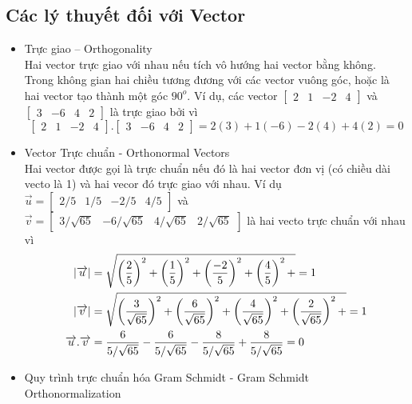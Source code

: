\subsection{Các lý thuyết đối với Vector}
\begin{itemize}
  \item Trực giao – Orthogonality\\
  Hai vector trực giao với nhau nếu tích vô hướng hai vector bằng không. Trong
  không gian hai chiều tương đương với các vector vuông góc, hoặc là hai vector
  tạo thành một góc $90^o$. Ví dụ, các vector $\begin{bmatrix} 2 & 1 & -2 & 4
  \end{bmatrix}$ và $\begin{bmatrix} 3 & -6 & 4 & 2 \end{bmatrix}$ là trực giao
  bởi vì
  \[ \begin{bmatrix} 2 & 1 & -2 & 4 \end{bmatrix} . \begin{bmatrix} 3 & -6 & 4 &
  2 \end{bmatrix} = 2(3) + 1(-6) - 2(4) + 4(2) = 0\]
  \item Vector Trực chuẩn - Orthonormal Vectors\\
  Hai vector được gọi là trực chuẩn nếu đó là hai vector đơn vị
  (có chiều dài vecto là 1) và hai vecor đó trực giao với nhau. Ví dụ
  $\overrightarrow{u} = \begin{bmatrix} 2/5 & 1/5 & -2/5 & 4/5
  \end{bmatrix}$ và $\overrightarrow{v} = \begin{bmatrix} 3/\sqrt{65} &
  -6/\sqrt{65} & 4/\sqrt{65} & 2/\sqrt{65} \end{bmatrix}$ là hai vecto trực chuẩn với nhau vì
  \begin{align}
  |\overrightarrow{u}| &= \sqrt{\left(\frac{2}{5}\right)^2 +
  \left(\frac{1}{5}\right)^2 + \left(\frac{-2}{5}\right)^2 + \left(\frac{4}{5}\right)^2 +} = 1\notag\\
  |\overrightarrow{v}| &= \sqrt{\left(\frac{3}{\sqrt{65}}\right)^2 +
  \left(\frac{6}{\sqrt{65}}\right)^2 + \left(\frac{4}{\sqrt{65}}\right)^2 + \left(\frac{2}{\sqrt{65}}\right)^2 +} = 1\notag\\
  \overrightarrow{u}.\overrightarrow{v} &= \frac{6}{5/\sqrt{65}} -
  \frac{6}{5/\sqrt{65}} - \frac{8}{5/\sqrt{65}} + \frac{8}{5/\sqrt{65}} =
  0\notag
  \end{align}
  \item Quy trình trực chuẩn hóa Gram Schmidt - Gram Schmidt  Orthonormalization

\end{itemize}
